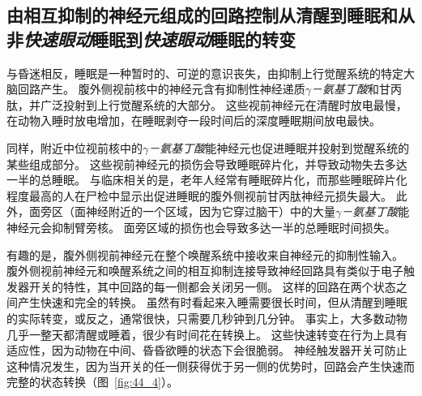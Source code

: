 \subsection{由相互抑制的神经元组成的回路控制从清醒到睡眠和从非\textit{快速眼动}睡眠到\textit{快速眼动}睡眠的转变}

与昏迷相反，睡眠是一种暂时的、可逆的意识丧失，由抑制上行觉醒系统的特定大脑回路产生。
腹外侧视前核中的神经元含有抑制性神经递质\textit{$\gamma$－氨基丁酸}和甘丙肽，并广泛投射到上行觉醒系统的大部分。
这些视前神经元在清醒时放电最慢，在动物入睡时放电增加，在睡眠剥夺一段时间后的深度睡眠期间放电最快。


同样，附近中位视前核中的\textit{$\gamma$－氨基丁酸}能神经元也促进睡眠并投射到觉醒系统的某些组成部分。
这些视前神经元的损伤会导致睡眠碎片化，并导致动物失去多达一半的总睡眠。
与临床相关的是，老年人经常有睡眠碎片化，而那些睡眠碎片化程度最高的人在尸检中显示出促进睡眠的腹外侧视前甘丙肽神经元损失最大。
此外，面旁区（面神经附近的一个区域，因为它穿过脑干）中的大量\textit{$\gamma$－氨基丁酸}能神经元会抑制臂旁核。
面旁区域的损伤也会导致多达一半的总睡眠时间损失。


有趣的是，腹外侧视前神经元在整个唤醒系统中接收来自神经元的抑制性输入。
腹外侧视前神经元和唤醒系统之间的相互抑制连接导致神经回路具有类似于电子触发器开关的特性，其中回路的每一侧都会关闭另一侧。
这样的回路在两个状态之间产生快速和完全的转换。
虽然有时看起来入睡需要很长时间，但从清醒到睡眠的实际转变，或反之，通常很快，只需要几秒钟到几分钟。
事实上，大多数动物几乎一整天都清醒或睡着，很少有时间花在转换上。
这些快速转变在行为上具有适应性，因为动物在中间、昏昏欲睡的状态下会很脆弱。
神经触发器开关可防止这种情况发生，因为当开关的任一侧获得优于另一侧的优势时，回路会产生快速而完整的状态转换（图~\ref{fig:44_4}）。


